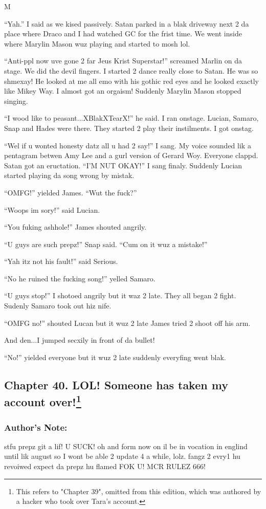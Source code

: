 M\documentclass{article}
\begin{document}
“Yah.” I said as we kised passively. Satan parked in a blak driveway next 2 da place where Draco and I had watched GC for the frist time. We went inside where Marylin Mason wuz playing and started to mosh lol.

“Anti-ppl now uve gone 2 far Jeus Krist Superstar!” screamed Marlin on da stage. We did the devil fingers. I started 2 dance really close to Satan. He was so shmexay! He looked at me all emo with his gothic red eyes and he looked exactly like Mikey Way. I almost got an orgaism! Suddenly Marylin Mason stopped singing.

“I wood like to peasant...XBlakXTearX!” he said. I ran onstage. Lucian, Samaro, Snap and Hades were there. They started 2 play their instilments. I got onstag.

“Wel if u wonted honesty datz all u had 2 say!” I sang. My voice sounded lik a pentagram betwen Amy Lee and a gurl version of Gerard Woy. Everyone clappd. Satan got an eructation. “I’M NUT OKAY!” I sang finaly. Suddenly Lucian started playing da song wrong by mistak.

“OMFG!” yielded James. “Wut the fuck?”

“Woops im sory!” said Lucian.

“You fuking ashhole!” James shouted angrily.

“U guys are such prepz!” Snap said. “Cum on it wuz a mistake!”

“Yah itz not his fault!” said Serious.

“No he ruined the fucking song!” yelled Samaro.

“U guys stop!” I shotoed angrily but it waz 2 late. They all began 2 fight. Sudenly Samaro took out hiz nife.

“OMFG no!” shouted Lucan but it wuz 2 late James tried 2 shoot off his arm.

And den...I jumped secxily in front of da bullet!

“No!” yielded everyone but it wuz 2 late suddenly everyfing went blak.
\clearpage\nolinenumbers
\subsection*{Chapter 40. LOL! Someone has taken my account over!\footnote{This refers to "Chapter 39", omitted from this edition, which was authored by a hacker who took over Tara's account.}}

\subsubsection*{Author's Note: }stfu prepz git a lif! U SUCK! oh and form now on il be in vocation in englind until lik august so I wont be able 2 update 4 a while, lolz. fangz 2 evry1 hu revoiwed expect da prepz hu flamed FOK U! MCR RULEZ 666!
\end{document}

